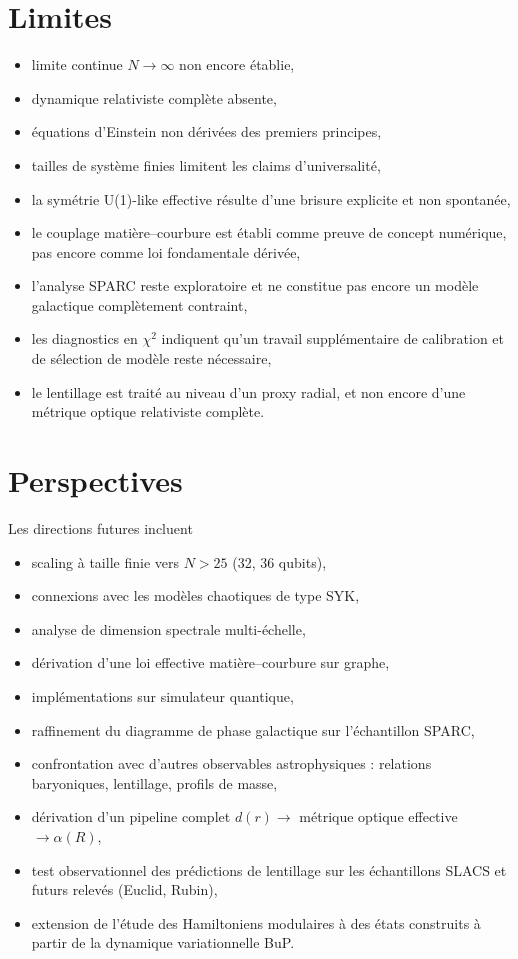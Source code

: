 \documentclass[11pt]{article}
\begin{document}
\section{Limites}

\begin{itemize}
\item limite continue $N\rightarrow\infty$ non encore établie,
\item dynamique relativiste complète absente,
\item équations d'Einstein non dérivées des premiers principes,
\item tailles de système finies limitent les claims d'universalité,
\item la symétrie U(1)-like effective résulte d'une brisure explicite et non spontanée,
\item le couplage matière--courbure est établi comme preuve de concept numérique, pas encore comme loi fondamentale dérivée,
\item l'analyse SPARC reste exploratoire et ne constitue pas encore un modèle galactique complètement contraint,
\item les diagnostics en $\chi^2$ indiquent qu'un travail supplémentaire de calibration et de sélection de modèle reste nécessaire,
\item le lentillage est traité au niveau d'un proxy radial, et non encore d'une métrique optique relativiste complète.
\end{itemize}

\section{Perspectives}

Les directions futures incluent

\begin{itemize}
\item scaling à taille finie vers $N>25$ (32, 36 qubits),
\item connexions avec les modèles chaotiques de type SYK,
\item analyse de dimension spectrale multi-échelle,
\item dérivation d'une loi effective matière--courbure sur graphe,
\item implémentations sur simulateur quantique,
\item raffinement du diagramme de phase galactique sur l'échantillon SPARC,
\item confrontation avec d'autres observables astrophysiques : relations baryoniques, lentillage, profils de masse,
\item dérivation d'un pipeline complet $d(r)\rightarrow$ métrique optique effective $\rightarrow \alpha(R)$,
\item test observationnel des prédictions de lentillage sur les échantillons SLACS et futurs relevés (Euclid, Rubin),
\item extension de l'étude des Hamiltoniens modulaires à des états construits à partir de la dynamique variationnelle BuP.
\end{itemize}
\end{document}
